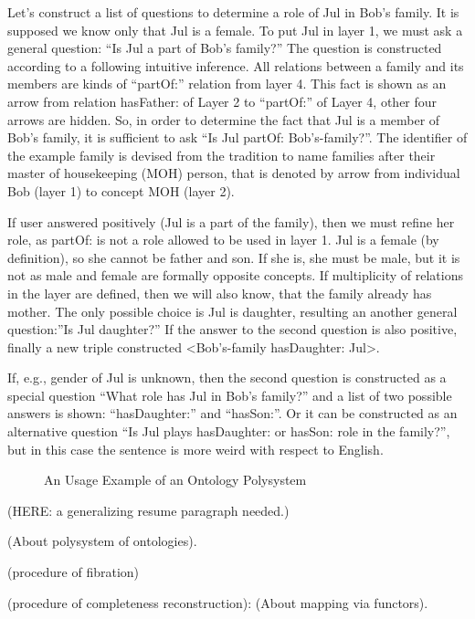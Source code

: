 \documentclass[conference]{IEEEtran}
\begin{document}
Let's construct a list of questions to determine a role of Jul in Bob's family. It is supposed we know only that Jul is a female. To put Jul in layer 1, we must ask a general question: ``Is Jul a part of Bob's family?'' The question is constructed according to a following intuitive inference. All relations between a family and its members are kinds of ``partOf:'' relation from layer 4. This fact is shown as an arrow from relation hasFather: of Layer 2 to ``partOf:'' of Layer 4, other four arrows are hidden. So, in order to determine the fact that Jul is a member of Bob's family, it is sufficient to ask ``Is Jul partOf: Bob's-family?''. The identifier of the example family is devised from the tradition to name families after their master of housekeeping (MOH) person, that is denoted by arrow from individual Bob (layer 1) to concept MOH (layer 2).

If user answered positively (Jul is a part of the family), then we must refine her role, as partOf: is not a role allowed to be used in layer 1. Jul is a female (by definition), so she cannot be father and son. If she is, she must be male, but it is not as male and female are formally opposite concepts. If multiplicity of relations in the layer are defined, then we will also know, that the family already has mother. The only possible choice is Jul is daughter, resulting an another general question:''Is Jul daughter?'' If the answer to the second question is also positive, finally a new triple constructed <Bob's-family hasDaughter: Jul>.

If, e.g., gender of Jul is unknown, then the second question is constructed as a special question ``What role has Jul in Bob's family?'' and a list of two possible answers is shown: ``hasDaughter:'' and ``hasSon:''. Or it can be constructed as an alternative question ``Is Jul plays hasDaughter: or hasSon: role in the family?'', but in this case the sentence is more weird with respect to English.

\begin{figure}
\centering\sf
\def\svgwidth{0.9\linewidth}

\caption{An  Usage Example of an Ontology Polysystem}
\label{OPSA}
\end{figure}

(HERE: a generalizing resume paragraph needed.)

(About polysystem of ontologies).

(procedure of fibration)

(procedure of completeness reconstruction): (About mapping via functors).
\end{document}
